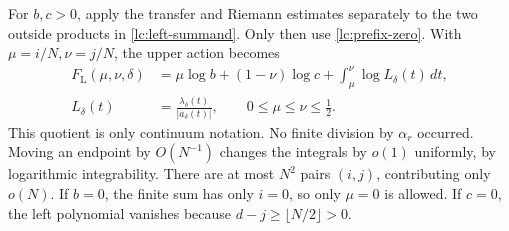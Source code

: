 \documentclass[11pt]{article}
\numberwithin{equation}{section}
\theoremstyle{remark}\newtheorem{remark}[theorem]{Remark}
\begin{document}
For \(b,c>0\), apply the transfer and Riemann estimates separately
to the two outside products in \eqref{lc:left-summand}. Only then
use \eqref{lc:prefix-zero}. With \(\mu=i/N,\nu=j/N\), the upper
action becomes
\begin{equation}\label{lc:left-action}
\begin{split}
 F_{\mathrm L}(\mu,\nu,\delta)
 &=\mu\log b+(1-\nu)\log c+
                   \int_\mu^\nu\log L_\delta(t)\,dt,\\
 L_\delta(t)&=\frac{\lambda_\delta(t)}{|a_\delta(t)|},
                      \qquad0\le\mu\le\nu\le\tfrac12.
\end{split}
\end{equation}
This quotient is only continuum notation. No finite division by
\(\alpha_r\) occurred. Moving an endpoint by \(O(N^{-1})\) changes
the integrals by \(o(1)\) uniformly, by logarithmic integrability.
There are at most \(N^2\) pairs \((i,j)\), contributing only \(o(N)\).
If \(b=0\), the finite sum has only \(i=0\), so only \(\mu=0\)
is allowed. If \(c=0\), the left polynomial vanishes because
\(d-j\ge\lfloor N/2\rfloor>0\).
\end{document}
